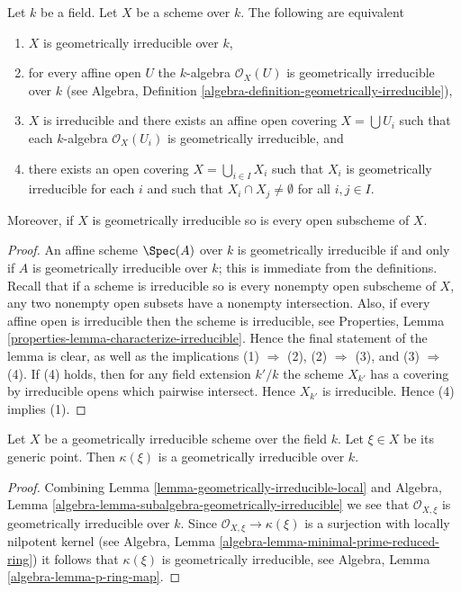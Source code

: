 \begin{lemma}
\label{lemma-geometrically-irreducible-local}
Let $k$ be a field. Let $X$ be a scheme over $k$.
The following are equivalent
\begin{enumerate}
\item $X$ is geometrically irreducible over $k$,
\item for every affine open $U$ the $k$-algebra $\mathcal{O}_X(U)$
is geometrically irreducible over $k$ (see
Algebra, Definition \ref{algebra-definition-geometrically-irreducible}),
\item $X$ is irreducible and there exists an affine open covering
$X = \bigcup U_i$ such that each $k$-algebra $\mathcal{O}_X(U_i)$ is
geometrically irreducible, and
\item there exists an open covering $X = \bigcup_{i \in I} X_i$ such
that $X_i$ is geometrically irreducible for each $i$ and such that
$X_i \cap X_j \not = \emptyset$ for all $i, j \in I$.
\end{enumerate}
Moreover, if $X$ is geometrically irreducible so is every
open subscheme of $X$.
\end{lemma}

\begin{proof}
An affine scheme $\Spec(A)$ over $k$ is geometrically
irreducible if and only if $A$ is geometrically irreducible over $k$;
this is immediate from the definitions.
Recall that if a scheme is irreducible so is every nonempty
open subscheme of $X$, any two nonempty open subsets have
a nonempty intersection. Also, if every affine open is irreducible
then the scheme is irreducible, see Properties,
Lemma \ref{properties-lemma-characterize-irreducible}.
Hence the final statement of the lemma
is clear, as well as the implications (1) $\Rightarrow$ (2),
(2) $\Rightarrow$ (3), and (3) $\Rightarrow$ (4). If (4) holds,
then for any field extension $k'/k$ the scheme $X_{k'}$
has a covering by irreducible opens which pairwise intersect.
Hence $X_{k'}$ is irreducible. Hence (4) implies (1).
\end{proof}

\begin{lemma}
\label{lemma-geometrically-irreducible-function-field}
Let $X$ be a geometrically irreducible scheme over the field $k$.
Let $\xi \in X$ be its generic point. Then $\kappa(\xi)$ is a
geometrically irreducible over $k$.
\end{lemma}

\begin{proof}
Combining
Lemma \ref{lemma-geometrically-irreducible-local}
and
Algebra, Lemma \ref{algebra-lemma-subalgebra-geometrically-irreducible}
we see that $\mathcal{O}_{X, \xi}$ is geometrically irreducible over $k$.
Since $\mathcal{O}_{X, \xi} \to \kappa(\xi)$ is a surjection with
locally nilpotent kernel (see
Algebra, Lemma \ref{algebra-lemma-minimal-prime-reduced-ring})
it follows that $\kappa(\xi)$ is geometrically irreducible, see
Algebra, Lemma \ref{algebra-lemma-p-ring-map}.
\end{proof}

